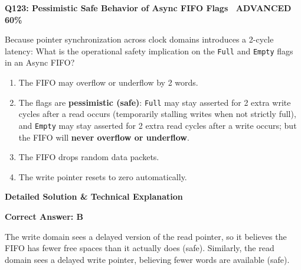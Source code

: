\documentclass[11pt,a4paper]{article}
\newcommand{\badgeadv}{{\color{white}\colorbox{advred}{\bfseries\sffamily\tiny\ ADVANCED 60\%\ }}}
\newenvironment{qbox}[2]{%
  \begin{mdframed}[style=qstyle]%
  {\bfseries\sffamily\color{primaryblue}#1 \hfill #2}\par\vspace{2pt}%
}{%
  \end{mdframed}%
}
\newenvironment{ansbox}{%
  \begin{mdframed}[style=ansstyle]%
  {\bfseries\sffamily\color{ansgreen}\small Detailed Solution \& Technical Explanation}\par\vspace{2pt}\small%
}{%
  \end{mdframed}%
}
\begin{document}
\begin{qbox}{Q123: Pessimistic Safe Behavior of Async FIFO Flags}{\badgeadv}
Because pointer synchronization across clock domains introduces a 2-cycle latency:
What is the operational safety implication on the \texttt{Full} and \texttt{Empty} flags in an Async FIFO?
\begin{enumerate}[label=\textbf{\Alph*.}]
  \item The FIFO may overflow or underflow by 2 words.
  \item The flags are \textbf{pessimistic (safe)}: \texttt{Full} may stay asserted for 2 extra write cycles after a read occurs (temporarily stalling writes when not strictly full), and \texttt{Empty} may stay asserted for 2 extra read cycles after a write occurs; but the FIFO will \textbf{never overflow or underflow}.
  \item The FIFO drops random data packets.
  \item The write pointer resets to zero automatically.
\end{enumerate}
\end{qbox}
\begin{ansbox}
\textbf{Correct Answer: B}

The write domain sees a delayed version of the read pointer, so it believes the FIFO has fewer free spaces than it actually does (safe). Similarly, the read domain sees a delayed write pointer, believing fewer words are available (safe).
\end{ansbox}
\end{document}
